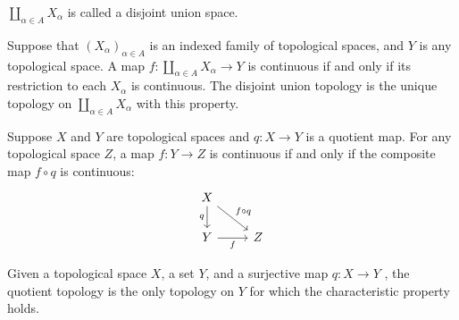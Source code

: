 $\coprod_{\alpha\in A}X_{\alpha}$ is called a disjoint union space. 
\begin{theorem}
Suppose that $(X_{\alpha})_{\alpha\in A}$ is an indexed family of topological spaces, and $Y$ is any topological space. A map $f:\coprod_{\alpha\in A}X_{\alpha}\to Y$ is continuous if and only if its restriction to each $X_{\alpha}$ is continuous. The disjoint union topology is the unique topology on $\coprod_{\alpha\in A}X_{\alpha}$ with this property.
\end{theorem}
\begin{theorem}
Suppose $X$ and $Y$ are topological spaces and $q:X\to Y$ is a quotient map. For any topological
space $Z$, a map $f:Y\to Z$ is continuous if and only if the composite map $f\circ q$ is
continuous:
\[\begin{tikzcd}
X\ar[d,swap,"q"]\ar[dr,"f\circ q"]&\\
Y\ar[r,swap,"f"]&Z
\end{tikzcd}\]
\end{theorem}
\begin{theorem}
Given a topological space $X$, a set $Y$, and a surjective map $q:X\to Y$ , the quotient topology is the only topology on $Y$ for which the characteristic property holds.
\end{theorem}